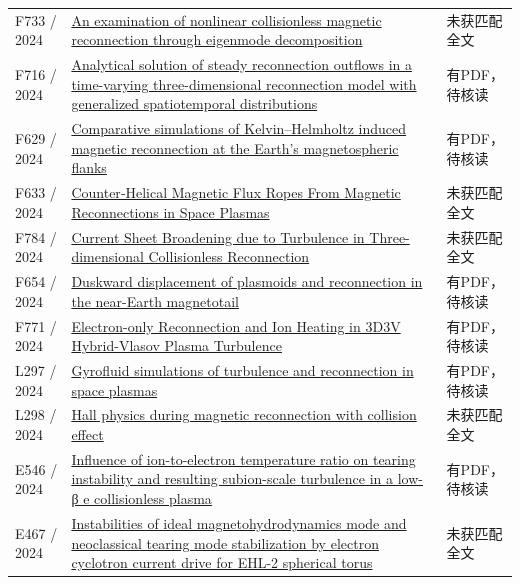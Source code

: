 \begin{longtable}{P{24mm}P{97mm}P{27mm}}
F733 / 2024 & \href{https://doi.org/10.1063/5.0226026}{An examination of nonlinear collisionless magnetic reconnection through eigenmode decomposition} & 未获匹配全文\\

F716 / 2024 & \href{https://doi.org/10.3389/fphy.2024.1439949}{Analytical solution of steady reconnection outflows in a time-varying three-dimensional reconnection model with generalized spatiotemporal distributions} & 有PDF，待核读\\

F629 / 2024 & \href{https://doi.org/10.1063/5.0191674}{Comparative simulations of Kelvin–Helmholtz induced magnetic reconnection at the Earth's magnetospheric flanks} & 有PDF，待核读\\

F633 / 2024 & \href{https://doi.org/10.1029/2024gl108270}{Counter‐Helical Magnetic Flux Ropes From Magnetic Reconnections in Space Plasmas} & 未获匹配全文\\

F784 / 2024 & \href{https://doi.org/10.3847/1538-4357/ad7f54}{Current Sheet Broadening due to Turbulence in Three-dimensional Collisionless Reconnection} & 未获匹配全文\\

F654 / 2024 & \href{https://doi.org/10.1186/s40623-024-02003-w}{Duskward displacement of plasmoids and reconnection in the near-Earth magnetotail} & 有PDF，待核读\\

F771 / 2024 & \href{https://doi.org/10.3847/1538-4357/ad6a19}{Electron-only Reconnection and Ion Heating in 3D3V Hybrid-Vlasov Plasma Turbulence} & 有PDF，待核读\\

L297 / 2024 & \href{https://doi.org/10.1016/j.fpp.2024.100055}{Gyrofluid simulations of turbulence and reconnection in space plasmas} & 有PDF，待核读\\

L298 / 2024 & \href{https://doi.org/10.1088/1361-6587/ad2b8f}{Hall physics during magnetic reconnection with collision effect} & 未获匹配全文\\

E546 / 2024 & \href{https://doi.org/10.1063/5.0185897}{Influence of ion-to-electron temperature ratio on tearing instability and resulting subion-scale turbulence in a low- β e collisionless plasma} & 有PDF，待核读\\

E467 / 2024 & \href{https://doi.org/10.1088/2058-6272/ada421}{Instabilities of ideal magnetohydrodynamics mode and neoclassical tearing mode stabilization by electron cyclotron current drive for EHL-2 spherical torus} & 未获匹配全文\\


\end{longtable}
